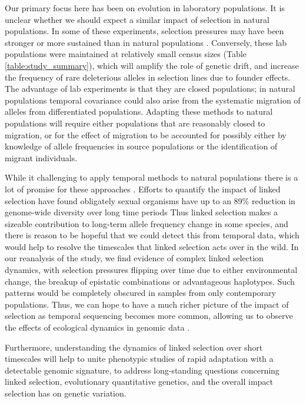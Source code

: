 \documentclass[11pt]{article}
\begin{document}
Our primary focus here has been on evolution in laboratory populations. It is
unclear whether we should expect a similar impact of selection in natural
populations. In some of these experiments, selection pressures may have been
stronger or more sustained than in natural populations
\parencite{Hendry1999-zu,Hairston2005-ga}. Conversely, these lab populations
were maintained at relatively small census sizes (Table
\ref{table:study_summary}), which will amplify the role of genetic drift,
and increase the frequency of rare deleterious alleles in selection lines
due to founder effects. The advantage of lab experiments is that they are
closed populations; in natural populations temporal covariance could also
arise from the systematic migration of alleles from differentiated populations.
Adapting these methods to natural populations will require either populations
that are reasonably closed to migration, or for the effect of migration to be
accounted for possibly either by knowledge of allele frequencies in source
populations or the identification of migrant individuals. 

While it challenging to apply temporal methods to natural populations there is
a lot of promise for these approaches
\parencite{Bergland2014-ij,Machado2018-cs}. Efforts to quantify the impact of
linked selection have found obligately sexual organisms have up to an 89\%
reduction in genome-wide diversity over long time periods
\parencite{McVicker2009-ax,Elyashiv2016-vt,Corbett-Detig2015-gt,Coop2016-gx,Comeron2014-nh}
Thus linked selection makes a sizeable contribution to long-term allele
frequency change in some species, and there is reason to be hopeful that we
could detect this from temporal data, which would help to resolve the
timescales that linked selection acts over in the wild. In our
reanalysis of the \textcite{Barghi2019-qy} study, we find evidence of complex
linked selection dynamics, with selection pressures flipping over time due to
either environmental change, the breakup of epistatic combinations or
advantageous haplotypes. Such patterns would be completely obscured in samples
from only contemporary populations. Thus, we can hope to have a much
richer picture of the impact of selection as temporal sequencing becomes more
common, allowing us to observe the effects of ecological dynamics in genomic
data \parencite{Hairston2005-ga}.

Furthermore, understanding the dynamics of linked selection over short
timescales will help to unite phenotypic studies of rapid adaptation with a
detectable genomic signature, to address long-standing questions concerning
linked selection, evolutionary quantitative genetics, and the overall impact
selection has on genetic variation. 
\end{document}
